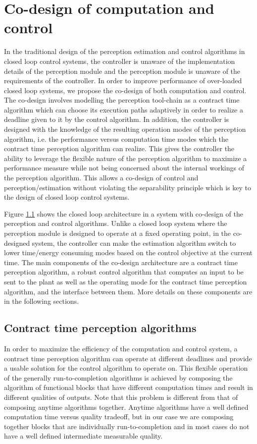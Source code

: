 

\section{Co-design of computation and control}

In the traditional design of the perception estimation and control algorithms in closed loop control systems, the controller is unaware of the implementation details of the perception module and the perception module is unaware of the requirements of the controller. In order to improve performance of over-loaded closed loop systems, we propose the co-design of both computation and control. The co-design involves modelling the perception tool-chain as a contract time algorithm which can choose its execution paths adaptively in order to realize a deadline given to it by the control algorithm. In addition, the controller is designed with the knowledge of the resulting operation modes of the perception algorithm, i.e. the performance versus computation time modes which the contract time perception algorithm can realize. This gives the controller the ability to leverage the flexible nature of the perception algorithm to maximize a performance measure while not being concerned about the internal workings of the perception algorithm. This allows a co-design of control and perception/estimation without violating the separability principle which is key to the design of closed loop control systems.

Figure \ref{} shows the closed loop architecture in a system with co-design of the perception and control algorithms. Unlike a closed loop system where the perception module is designed to operate at a fixed operating point, in the co-designed system, the controller can make the estimation algorithm switch to lower time/energy consuming modes based on the control objective at the current time. The main components of the co-design architecture are a contract time perception algorithm, a robust control algorithm that computes an input to be sent to the plant as well as the operating mode for the contract time perception algorithm, and the interface between them. More details on these components are in the following sections.

\subsection{Contract time perception algorithms}

In order to maximize the efficiency of the computation and control system, a contract time perception algorithm can operate at different deadlines and provide a usable solution for the control algorithm to operate on. This flexible operation of the generally run-to-completion algorithms is achieved by composing the algorithm of functional blocks that have different computation times and result in different qualities of outputs. Note that this problem is different from that of composing anytime algorithms together. Anytime algorithms have a well defined computation time versus quality tradeoff, but in our case we are composing together blocks that are individually run-to-completion and in most cases do not have a well defined intermediate measurable quality.


